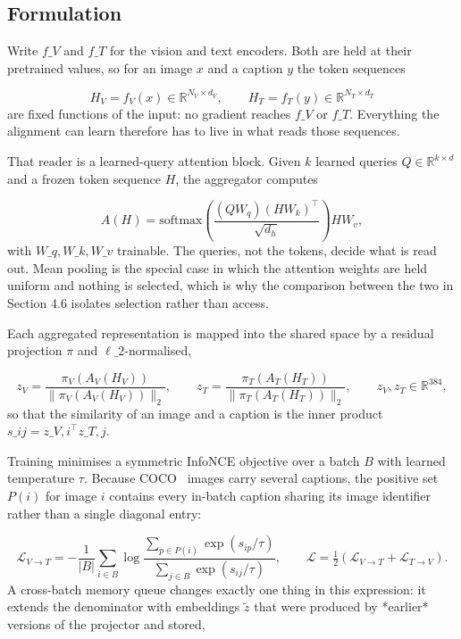 \subsection{Formulation}
Write $f\_V$ and $f\_T$ for the vision and text encoders. Both are held at their pretrained values, so for an image $x$ and a caption $y$ the token sequences

\begin{equation*}
H_V = f_V(x) \in \mathbb{R}^{N_V \times d_V},
\qquad
H_T = f_T(y) \in \mathbb{R}^{N_T \times d_T}
\end{equation*}
are fixed functions of the input: no gradient reaches $f\_V$ or $f\_T$. Everything the alignment can learn therefore has to live in what reads those sequences.

That reader is a learned-query attention block. Given $k$ learned queries $Q \in \mathbb{R}^{k \times d}$ and a frozen token sequence $H$, the aggregator computes

\begin{equation*}
A(H) = \mathrm{softmax}\!\left(
  \frac{(QW_q)(HW_k)^{\top}}{\sqrt{d_h}}
\right) HW_v ,
\end{equation*}
with $W\_q, W\_k, W\_v$ trainable. The queries, not the tokens, decide what is read out. Mean pooling is the special case in which the attention weights are held uniform and nothing is selected, which is why the comparison between the two in Section 4.6 isolates selection rather than access.

Each aggregated representation is mapped into the shared space by a residual projection $\pi$ and $\ell\_2$-normalised,

\begin{equation*}
z_V = \frac{\pi_V(A_V(H_V))}{\lVert \pi_V(A_V(H_V)) \rVert_2},
\qquad
z_T = \frac{\pi_T(A_T(H_T))}{\lVert \pi_T(A_T(H_T)) \rVert_2},
\qquad
z_V, z_T \in \mathbb{R}^{384},
\end{equation*}
so that the similarity of an image and a caption is the inner product $s\_{ij} = z\_{V,i}^{\top} z\_{T,j}$.

Training minimises a symmetric InfoNCE objective over a batch $B$ with learned temperature $\tau$. Because COCO~\cite{lin2014coco} images carry several captions, the positive set $P(i)$ for image $i$ contains every in-batch caption sharing its image identifier rather than a single diagonal entry:

\begin{equation*}
\mathcal{L}_{V \rightarrow T}
= -\frac{1}{|B|} \sum_{i \in B} \log
\frac{\sum_{p \in P(i)} \exp(s_{ip} / \tau)}
     {\sum_{j \in B} \exp(s_{ij} / \tau)},
\qquad
\mathcal{L} = \tfrac{1}{2}\left(
  \mathcal{L}_{V \rightarrow T} + \mathcal{L}_{T \rightarrow V}
\right).
\end{equation*}
A cross-batch memory queue changes exactly one thing in this expression: it extends the denominator with embeddings $\tilde{z}$ that were produced by *earlier* versions of the projector and stored,

